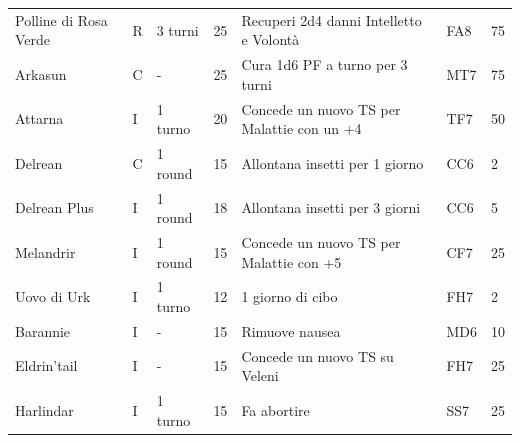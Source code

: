 \documentclass[a4paper,11pt,twoside,openany]{book}
\begin{document}
\begin{tabularx}{0.95\textwidth}{llllXll}
	Polline di Rosa Verde\index{Polline di Rosa Verde}& R  & 3 turni   & 25& Recuperi 2d4 danni Intelletto e Volontà  & FA8 & 75   \\
	Arkasun\index{Arkasun}   & C  & -    & 25& Cura 1d6 PF a turno per 3 turni& MT7 & 75   \\
Attarna\index{Attarna}   & I  & 1 turno   & 20& Concede un nuovo TS per Malattie con un +4    & TF7 & 50   \\
Delrean\index{Delrean}   & C  & 1 round   & 15& Allontana insetti per 1 giorno & CC6 & 2    \\
Delrean Plus\index{Delrean Plus}   & I  & 1 round   & 18& Allontana insetti per 3 giorni & CC6 & 5    \\
Melandrir\index{Melandrir}    & I  & 1 round   & 15& Concede un nuovo TS per Malattie con +5  & CF7 & 25   \\
Uovo di Urk\index{Uovo di Urk}& I  & 1 turno   & 12& 1 giorno di cibo& FH7 & 2    \\
Barannie\index{Barannie} & I  & -    & 15& Rimuove nausea   & MD6 & 10   \\
Eldrin'tail\index{Eldrin'tail}& I  & -    & 15& Concede un nuovo TS su Veleni  & FH7 & 25   \\
Harlindar\index{Harlindar}    & I  & 1 turno   & 15& Fa abortire& SS7 & 25   \\
\end{tabularx}

\bigskip
\end{document}
